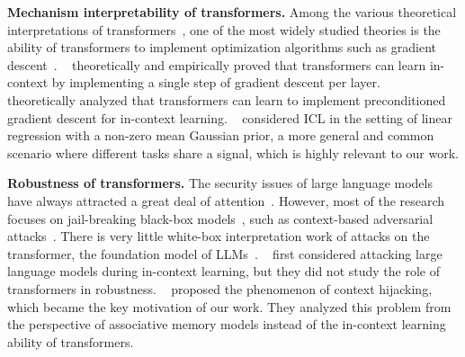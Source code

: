 \textbf{Mechanism interpretability of transformers.}
Among the various theoretical interpretations of transformers~\cite{friedman2024learning,yuntransformers,dehghaniuniversal,lindner2024tracr, pandit2021probing,perez2021attention, bills2023language,wei2022statistically,weiss2021thinking,zhoualgorithms, chen2024can}, one of the most widely studied theories is the ability of transformers to implement optimization algorithms such as gradient descent~\cite{von2023transformers,ahn2023transformers,zhang2024context,bai2024transformers,wumany,chengtransformers,akyureklearning,dai2023can,zhang2024trained}.
~\citet{von2023transformers} theoretically and empirically proved that transformers can learn in-context by implementing a single step of gradient descent per layer. %
~\citet{ahn2023transformers} theoretically analyzed that transformers can learn to implement preconditioned gradient descent for in-context learning.%
~\citet{zhang2024context} considered ICL in the setting of linear regression with a non-zero mean Gaussian prior, a more general and common scenario where different tasks share a signal, which is highly relevant to our work.

\textbf{Robustness of transformers.}
The security issues of large language models have always attracted a great deal of attention~\cite{yao2024survey,liu2023prompt,perezignore,zou2023universal,apruzzese2023real}. However, most of the research focuses on jail-breaking black-box models~\cite{chowdhury2024breaking}, such as context-based adversarial attacks~\cite{kumar2023certifying,wei2023jailbreak,xullm,wang2023adversarial,zhu2023promptbench,cheng2024leveraging,wang2023robustness}. There is very little white-box interpretation work of attacks on the transformer, the foundation model of LLMs~\cite{qiang2023hijacking,baileyimage,he2024data,anwar2024adversarial,jiangllms}. 
~\citet{qiang2023hijacking} first considered attacking large language models during in-context learning, but they did not study the role of transformers in robustness. 
~\citet{jiangllms} proposed the phenomenon of context hijacking, which became the key motivation of our work. They analyzed this problem from the perspective of associative memory models instead of the in-context learning ability of transformers.%